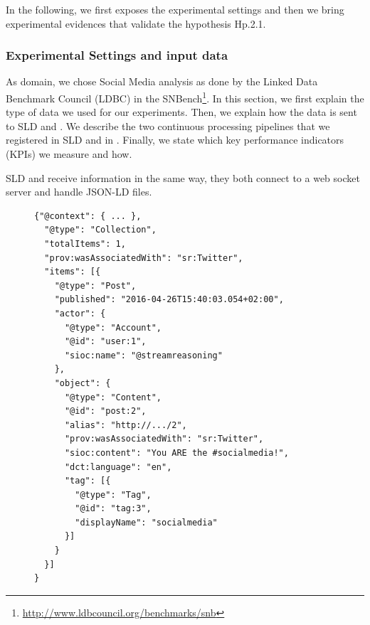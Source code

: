 In the following, we first exposes the experimental settings and then we bring experimental evidences that validate the hypothesis \textsf{Hp.2.1}.

\subsubsection{Experimental Settings and input data}
As domain, we chose Social Media analysis as done by the Linked Data Benchmark Council (LDBC) in the SNBench\footnote{\url{http://www.ldbcouncil.org/benchmarks/snb}}. In this section, we first explain the type of data we used for our experiments. Then, we explain how the data is sent to SLD and \sti{}. We describe the two continuous processing pipelines that we registered in SLD and in \sti{}. Finally, we state which key performance indicators (KPIs) we measure and how.

SLD and \sti{} receive information in the same way, they both connect to a web socket server and handle JSON-LD files. 

\begin{figure}[ht]
\begin{minipage}{0.95\linewidth}
\begin{lstlisting}[caption={JSON representation of a Twitter micro-post. Due to the lack of space we omitted the context declaration that contains the namespace.},label=lst:json-post, style=JSON]
{"@context": { ... }, 
  "@type": "Collection",
  "totalItems": 1,
  "prov:wasAssociatedWith": "sr:Twitter",
  "items": [{
    "@type": "Post",
    "published": "2016-04-26T15:40:03.054+02:00",
    "actor": {
      "@type": "Account",
      "@id": "user:1",
      "sioc:name": "@streamreasoning"
    },
    "object": {
      "@type": "Content",
      "@id": "post:2",
      "alias": "http://.../2",
      "prov:wasAssociatedWith": "sr:Twitter",
      "sioc:content": "You ARE the #socialmedia!",
      "dct:language": "en",
      "tag": [{
        "@type": "Tag",
        "@id": "tag:3",
        "displayName": "socialmedia"
      }]
    }
  }]
}
\end{lstlisting}
\end{minipage}
\end{figure}

